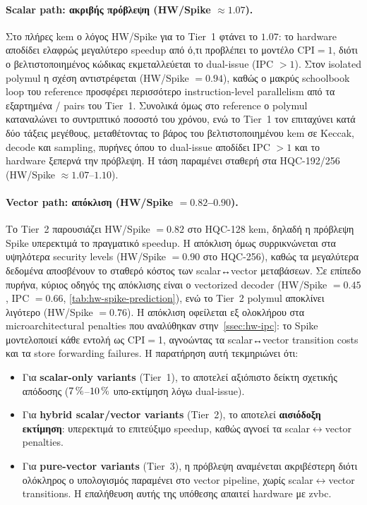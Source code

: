 \paragraph{Scalar path: ακριβής πρόβλεψη (HW/Spike $\approx 1.07$).}
Στο πλήρες \gls{kem} ο λόγος HW/Spike για το Tier~1 φτάνει το $1.07$: το
hardware αποδίδει ελαφρώς μεγαλύτερο speedup από ό,τι προβλέπει το μοντέλο
CPI$=1$, διότι ο βελτιστοποιημένος κώδικας εκμεταλλεύεται το dual-issue
(IPC $> 1$). Στον isolated polymul η σχέση αντιστρέφεται (HW/Spike $= 0.94$),
καθώς ο μακρύς schoolbook loop του reference προσφέρει περισσότερο
instruction-level parallelism από τα εξαρτημένα /
pairs του Tier~1. Συνολικά όμως στο reference ο polymul καταναλώνει το συντριπτικό ποσοστό του χρόνου, ενώ το
Tier~1 τον επιταχύνει κατά δύο τάξεις μεγέθους, μεταθέτοντας το βάρος του
βελτιστοποιημένου \gls{kem} σε Keccak, decode και sampling, πυρήνες όπου το
dual-issue αποδίδει IPC $> 1$ και το hardware ξεπερνά την πρόβλεψη. Η τάση
παραμένει σταθερή στα HQC-192/256 (HW/Spike $\approx 1.07$–$1.10$).

\paragraph{Vector path: απόκλιση (HW/Spike $= 0.82$–$0.90$).}
Το Tier~2 παρουσιάζει HW/Spike $= 0.82$ στο HQC-128 \gls{kem}, δηλαδή η πρόβλεψη Spike υπερεκτιμά το πραγματικό speedup. 
Η απόκλιση όμως συρρικνώνεται στα υψηλότερα security levels (HW/Spike $= 0.90$ στο HQC-256), 
καθώς τα μεγαλύτερα δεδομένα αποσβένουν το σταθερό κόστος των scalar↔vector μεταβάσεων. Σε επίπεδο
πυρήνα, κύριος οδηγός της απόκλισης είναι ο vectorized decoder (HW/Spike $=
0.45$, IPC $= 0.66$, \cref{tab:hw-spike-prediction}), ενώ το Tier~2 polymul
αποκλίνει λιγότερο (HW/Spike $= 0.76$). Η
απόκλιση οφείλεται εξ ολοκλήρου στα microarchitectural penalties που
αναλύθηκαν στην~\cref{ssec:hw-ipc}: το Spike μοντελοποιεί κάθε εντολή
ως CPI$=$1, αγνοώντας τα scalar↔vector transition costs και τα store
forwarding failures. Η παρατήρηση αυτή τεκμηριώνει ότι:
\begin{itemize}
  \item Για \textbf{scalar-only variants} (Tier~1), το \instret
    αποτελεί αξιόπιστο δείκτη σχετικής απόδοσης ($\SI{7}{\percent}$–$\SI{10}{\percent}$
    υπο-εκτίμηση λόγω dual-issue).
  \item Για \textbf{hybrid scalar/vector variants} (Tier~2), το \instret
    αποτελεί \textbf{αισιόδοξη εκτίμηση}: υπερεκτιμά το επιτεύξιμο speedup,
    καθώς αγνοεί τα scalar$\leftrightarrow$vector penalties.
  \item Για \textbf{pure-vector variants} (Tier~3), η πρόβλεψη
    αναμένεται ακριβέστερη διότι ολόκληρος ο υπολογισμός παραμένει στο
    vector pipeline, χωρίς scalar$\leftrightarrow$vector transitions. Η επαλήθευση
    αυτής της υπόθεσης απαιτεί hardware με \gls{zvbc}.
\end{itemize}

